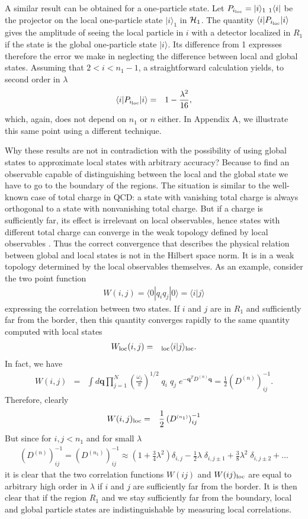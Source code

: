 \documentclass[10pt, nofootinbib]{revtex4}
\newcommand{\bea}{\begin{eqnarray}}
\newcommand{\eea}{\end{eqnarray}}
\begin{document}
A similar result can be obtained for a one-particle state.  Let
$P_{i_{\rm loc}}= | i \rangle_{1}\ {}_{1}\langle i |$ be the projector
on the local one-particle state $ | i \rangle_{1} $ in ${\cal H}_{1}$. 
The quantity $\langle i| P_{i_{\rm loc}}|i \rangle$ gives the
amplitude of seeing the local particle in $i$ with a detector
localized in $R_{1}$ if the state is the global one-particle state
$|i\rangle$.  Its difference from 1 expresses therefore the error we
make in neglecting the difference between local and global states. 
Assuming that $2<i<n_1-1$, a straightforward calculation yields, to
second order in $\lambda$
%
\bea
\langle i | P_{i_{\rm loc}}|i
\rangle &=& 1  - \frac{\lambda^2}{16},
\label{1p}
\eea
%
which, again, does not depend on $n_{1}$ or $n$ either. In Appendix A, 
we illustrate this same point using a different technique. 

Why these results are not in contradiction with the possibility of
using global states to approximate local states with arbitrary
accuracy?  Because to find an observable capable of distinguishing
between the local and the global state we have to go to the boundary
of the regions.  The situation is similar to the well-known case of
total charge in QCD: a state with vanishing total charge is always
orthogonal to a state with nonvanishing total charge.  But if a charge
is sufficiently far, its effect is irrelevant on local observables,
hence states with different total charge can converge in the weak
topology defined by local observables \cite{Streater}.  Thus the
correct convergence that describes the physical relation between
global and local states is not in the Hilbert space norm.  It is in a
weak topology determined by the local observables themselves.  As an
example, consider the two point function 
%
\bea
W(i,j)=\langle 0 | q_i q_j|0\rangle =\langle i | j \rangle 
\eea
%
expressing the correlation between two states. If $i$ and $j$ are in 
$R_{1}$ and sufficiently far from the border, then this quantity 
converges rapidly to the same quantity computed with local states 
%
\bea
W_{\rm loc}(i,j) &=& {}_{\rm loc}\langle i | j \rangle_{\rm loc}.  
\eea
%
In fact, we have 
%
\bea W(i,j)
 &=& \int d{\mathbf{q}}
\prod^{N}_{j=1} \left(\frac{\omega_j}{\pi}\right)^{1/2} \; q_i \; q_j
\;e^{-{\mathbf{q}}^{T}D^{\scriptscriptstyle{(n)}}{\mathbf{q}}} =
\frac{1}{2} \left(D^{\scriptscriptstyle{(n)}} \right)^{-1}_{ij}.
\eea
%
Therefore, clearly
%
\bea
W(i,j)_{\rm loc} &=& \frac{1}{2} 
\left(D^{\scriptscriptstyle{(n_{1})}} \right)^{-1}_{ij}
\eea
%
But since for $i,j<n_1$ and for small $\lambda$
%
\bea \left(D^{\scriptscriptstyle{(n)}} \right)^{-1}_{ij} =
\left(D^{\scriptscriptstyle{(n_{1})}} \right)^{-1}_{ij} \approx \left(
1+ \frac{3}{4} \lambda^2 \right) \delta_{i,j} - \frac{1}{2} \lambda \;
\delta_{i,j\pm 1} + \frac{3}{8} \lambda^2 \; \delta_{i,j\pm 2} +
\ldots \eea
%
it is clear that the two correlation functions $W(ij)$ and $W(ij)_{\rm
loc}$ are equal to arbitrary high order in $\lambda$ if $i$ and $j$
are sufficiently far from the border.  It is then clear that if the
region $R_{1}$ and we stay sufficiently far from the boundary, local
and global particle states are indistinguishable by measuring
local correlations.
\end{document}
